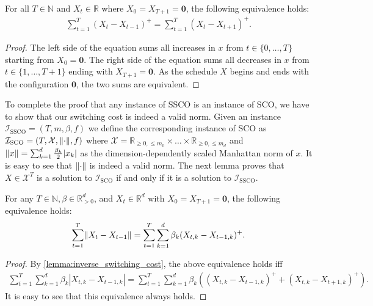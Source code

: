 \begin{lemma}
\label{lemma:inverse_switching_cost}
For all $T \in \mathbb{N}$ and $ X_t \in \mathbb{R}$ where $X_0 = X_{T+1} = \mathbf{0}$, the following equivalence holds:
\begin{align*}
    \sum_{t=1}^T (X_t - X_{t-1})^+ = \sum_{t=1}^T (X_t - X_{t+1})^+.
\end{align*}
\end{lemma}
\begin{proof}
The left side of the equation sums all increases in $x$ from $t \in \{0, \dots, T\}$ starting from $X_0 = \mathbf{0}$. The right side of the equation sums all decreases in $x$ from $t \in \{1, \dots, T+1\}$ ending with $X_{T+1} = \mathbf{0}$. As the schedule $X$ begins and ends with the configuration $\mathbf{0}$, the two sums are equivalent.
\end{proof}

To complete the proof that any instance of SSCO is an instance of SCO, we have to show that our switching cost is indeed a valid norm. Given an instance $\mathcal{I}_{\text{SSCO}} = (T, m, \beta, f)$ we define the corresponding instance of SCO as $\mathcal{I}_{\text{SCO}} = (T, \mathcal{X}, \lVert\cdot\rVert, f)$ where $\mathcal{X} = \mathbb{R}_{\geq 0, \leq m_0} \times \dots \times \mathbb{R}_{\geq 0, \leq m_d}$ and $\lVert x\rVert = \sum_{k=1}^d \frac{\beta_k}{2} |x_k|$ as the dimension-dependently scaled Manhattan norm of $x$. It is easy to see that $\lVert\cdot\rVert$ is indeed a valid norm. The next lemma proves that $X \in \mathcal{X}^T$ is a solution to $\mathcal{I}_{\text{SCO}}$ if and only if it is a solution to $\mathcal{I}_{\text{SSCO}}$.

\begin{lemma}\label{lemma:switching_cost_l1_norm_vs_pos_movement}
For any $T \in \mathbb{N}, \beta \in \mathbb{R}_{>0}^d$, and $X_t \in \mathbb{R}^d$ with $X_0 = X_{T+1} = \mathbf{0}$, the following equivalence holds:
\begin{align*}
    \sum_{t=1}^T \lVert X_t - X_{t-1}\rVert = \sum_{t=1}^T \sum_{k=1}^d \beta_k (X_{t,k} - X_{t-1,k})^+.
\end{align*}
\end{lemma}
\begin{proof}
By \autoref{lemma:inverse_switching_cost}, the above equivalence holds iff \begin{align*}
    \sum_{t=1}^T \sum_{k=1}^d \beta_k |X_{t,k} - X_{t-1,k}| = \sum_{t=1}^T \sum_{k=1}^d \beta_k ((X_{t,k} - X_{t-1,k})^+ + (X_{t,k} - X_{t+1,k})^+).
\end{align*}
It is easy to see that this equivalence always holds.
\end{proof}

